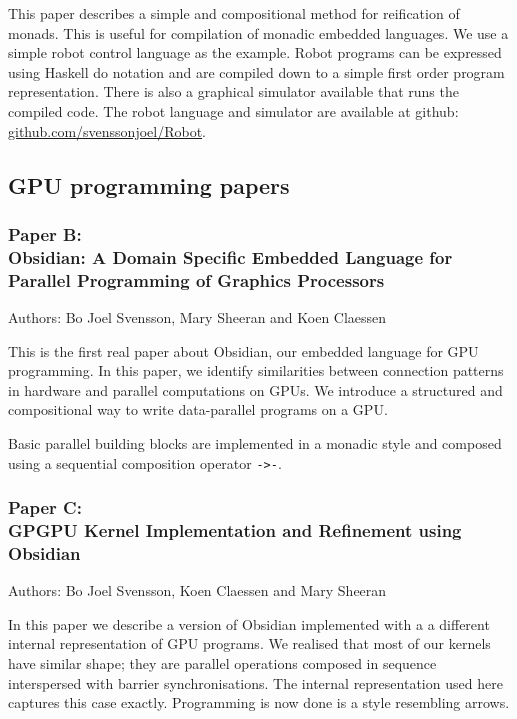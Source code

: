\documentclass[a4paper]{book}
\newcommand{\paperB}{Paper B}
\newcommand{\paperBTitle}{Obsidian: A Domain Specific Embedded Language for Parallel Programming of Graphics Processors}
\newcommand{\paperC}{Paper C}
\newcommand{\paperCTitle}{GPGPU Kernel Implementation and Refinement using Obsidian}
\begin{document}
\noindent This paper describes a simple and compositional method for 
reification of monads. This is useful for compilation of 
monadic embedded languages. We use a simple robot control language 
as the example. Robot programs can be expressed using Haskell do notation 
and are compiled down to a simple first order program representation. 
There is also a graphical simulator available that runs the compiled 
code. The robot language and simulator are available at github: \\ 
\url{github.com/svenssonjoel/Robot}.

\subsection{GPU programming papers} 

\subsubsection{\paperB: \\ \paperBTitle}

Authors: Bo Joel Svensson, Mary Sheeran and Koen Claessen \newline

\vspace{5mm}

This is the first real paper about Obsidian, our embedded language for GPU 
programming. In this paper, we identify similarities between 
connection patterns in hardware and parallel computations on GPUs. 
We introduce a structured and compositional way to write data-parallel 
programs on a GPU.

Basic parallel building blocks are implemented in a monadic style and 
composed using a sequential composition operator {\tt ->-}. 

\subsubsection{\paperC: \\ \paperCTitle}

Authors: Bo Joel Svensson, Koen Claessen and Mary Sheeran \newline

\vspace{5mm}

In this paper we describe a version of Obsidian implemented with a 
a different internal representation of GPU programs. We realised that 
most of our kernels have similar shape; they are parallel operations 
composed in sequence interspersed with barrier synchronisations. The 
internal representation used here captures this case exactly. Programming 
is now done is a style resembling arrows. 
\end{document}
